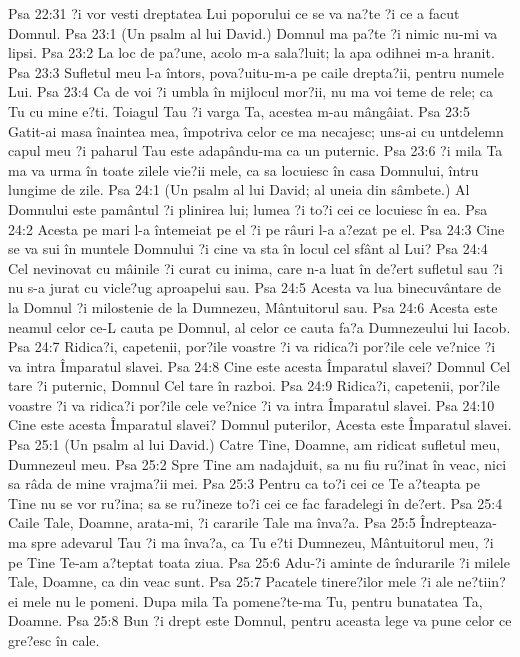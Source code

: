 Psa 22:31  ?i vor vesti dreptatea Lui poporului ce se va na?te ?i ce a facut Domnul.
Psa 23:1  (Un psalm al lui David.) Domnul ma pa?te ?i nimic nu-mi va lipsi.
Psa 23:2  La loc de pa?une, acolo m-a sala?luit; la apa odihnei m-a hranit.
Psa 23:3  Sufletul meu l-a întors, pova?uitu-m-a pe caile drepta?ii, pentru numele Lui.
Psa 23:4  Ca de voi ?i umbla în mijlocul mor?ii, nu ma voi teme de rele; ca Tu cu mine e?ti. Toiagul Tau ?i varga Ta, acestea m-au mângâiat.
Psa 23:5  Gatit-ai masa înaintea mea, împotriva celor ce ma necajesc; uns-ai cu untdelemn capul meu ?i paharul Tau este adapându-ma ca un puternic.
Psa 23:6  ?i mila Ta ma va urma în toate zilele vie?ii mele, ca sa locuiesc în casa Domnului, întru lungime de zile.
Psa 24:1  (Un psalm al lui David; al uneia din sâmbete.) Al Domnului este pamântul ?i plinirea lui; lumea ?i to?i cei ce locuiesc în ea.
Psa 24:2  Acesta pe mari l-a întemeiat pe el ?i pe râuri l-a a?ezat pe el.
Psa 24:3  Cine se va sui în muntele Domnului ?i cine va sta în locul cel sfânt al Lui?
Psa 24:4  Cel nevinovat cu mâinile ?i curat cu inima, care n-a luat în de?ert sufletul sau ?i nu s-a jurat cu vicle?ug aproapelui sau.
Psa 24:5  Acesta va lua binecuvântare de la Domnul ?i milostenie de la Dumnezeu, Mântuitorul sau.
Psa 24:6  Acesta este neamul celor ce-L cauta pe Domnul, al celor ce cauta fa?a Dumnezeului lui Iacob.
Psa 24:7  Ridica?i, capetenii, por?ile voastre ?i va ridica?i por?ile cele ve?nice ?i va intra Împaratul slavei.
Psa 24:8  Cine este acesta Împaratul slavei? Domnul Cel tare ?i puternic, Domnul Cel tare în razboi.
Psa 24:9  Ridica?i, capetenii, por?ile voastre ?i va ridica?i por?ile cele ve?nice ?i va intra Împaratul slavei.
Psa 24:10  Cine este acesta Împaratul slavei? Domnul puterilor, Acesta este Împaratul slavei.
Psa 25:1  (Un psalm al lui David.) Catre Tine, Doamne, am ridicat sufletul meu, Dumnezeul meu.
Psa 25:2  Spre Tine am nadajduit, sa nu fiu ru?inat în veac, nici sa râda de mine vrajma?ii mei.
Psa 25:3  Pentru ca to?i cei ce Te a?teapta pe Tine nu se vor ru?ina; sa se ru?ineze to?i cei ce fac faradelegi în de?ert.
Psa 25:4  Caile Tale, Doamne, arata-mi, ?i cararile Tale ma înva?a.
Psa 25:5  Îndrepteaza-ma spre adevarul Tau ?i ma înva?a, ca Tu e?ti Dumnezeu, Mântuitorul meu, ?i pe Tine Te-am a?teptat toata ziua.
Psa 25:6  Adu-?i aminte de îndurarile ?i milele Tale, Doamne, ca din veac sunt.
Psa 25:7  Pacatele tinere?ilor mele ?i ale ne?tiin?ei mele nu le pomeni. Dupa mila Ta pomene?te-ma Tu, pentru bunatatea Ta, Doamne.
Psa 25:8  Bun ?i drept este Domnul, pentru aceasta lege va pune celor ce gre?esc în cale.
